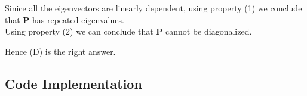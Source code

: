 \documentclass[journal,12pt,twocolumn]{IEEEtran}
\begin{document}
Sinice all the eigenvectors are linearly dependent, using property (1) we conclude that \textbf{P} has repeated eigenvalues. \\
Using property (2) we can conclude that \textbf{P} cannot be diagonalized.

Hence (D) is the right answer.





    





  
\subsection{\textbf{Code Implementation}}
\end{document}
